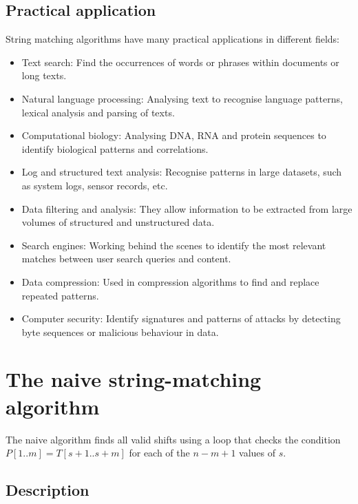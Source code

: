 \documentclass[11pt]{article}
\begin{document}
        \subsection{Practical application} \label{subsec:practical_application}

            String matching algorithms have many practical applications in different fields:
            \begin{itemize}
                \item Text search: Find the occurrences of words or phrases within documents or long texts.
                \item Natural language processing: Analysing text to recognise language patterns, lexical analysis and parsing of texts.
                \item Computational biology: Analysing DNA, RNA and protein sequences to identify biological patterns and correlations.
                \item Log and structured text analysis: Recognise patterns in large datasets, such as system logs, sensor records, etc.
                \item Data filtering and analysis: They allow information to be extracted from large volumes of structured and unstructured data.
                \item Search engines: Working behind the scenes to identify the most relevant matches between user search queries and content.
                \item Data compression: Used in compression algorithms to find and replace repeated patterns.
                \item Computer security: Identify signatures and patterns of attacks by detecting byte sequences or malicious behaviour in data.
            \end{itemize}

    \section{The naive string-matching algorithm} \label{sec:naive_string_matching_algorithm}

        The naive algorithm finds all valid shifts using a loop that checks the condition $P[1..m] = T[s+1..s+m]$ for each of the $n - m + 1$ values of $s$.

        \subsection{Description}\label{subsec:naive_description}
\end{document}
